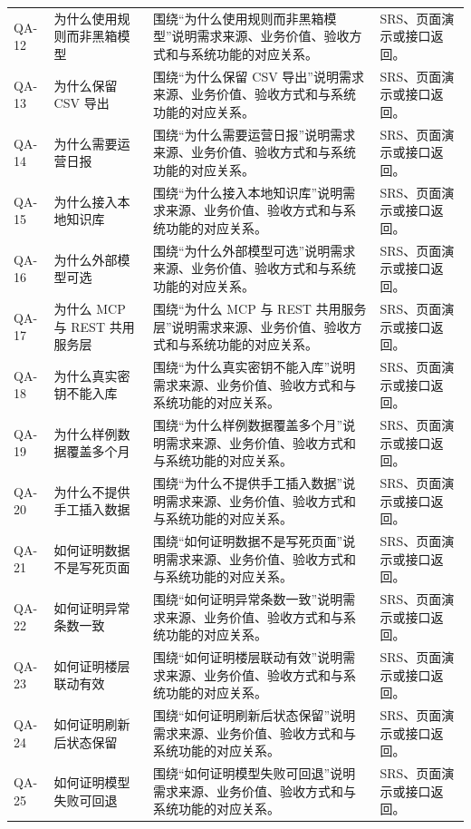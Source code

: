 \documentclass[12pt,a4paper]{ctexart}
\begin{document}
\begin{longtable}{L{1.7cm}L{4.4cm}L{6.0cm}L{3.4cm}}
QA-12 & 为什么使用规则而非黑箱模型 & 围绕“为什么使用规则而非黑箱模型”说明需求来源、业务价值、验收方式和与系统功能的对应关系。 & SRS、页面演示或接口返回。 \\
QA-13 & 为什么保留 CSV 导出 & 围绕“为什么保留 CSV 导出”说明需求来源、业务价值、验收方式和与系统功能的对应关系。 & SRS、页面演示或接口返回。 \\
QA-14 & 为什么需要运营日报 & 围绕“为什么需要运营日报”说明需求来源、业务价值、验收方式和与系统功能的对应关系。 & SRS、页面演示或接口返回。 \\
QA-15 & 为什么接入本地知识库 & 围绕“为什么接入本地知识库”说明需求来源、业务价值、验收方式和与系统功能的对应关系。 & SRS、页面演示或接口返回。 \\
QA-16 & 为什么外部模型可选 & 围绕“为什么外部模型可选”说明需求来源、业务价值、验收方式和与系统功能的对应关系。 & SRS、页面演示或接口返回。 \\
QA-17 & 为什么 MCP 与 REST 共用服务层 & 围绕“为什么 MCP 与 REST 共用服务层”说明需求来源、业务价值、验收方式和与系统功能的对应关系。 & SRS、页面演示或接口返回。 \\
QA-18 & 为什么真实密钥不能入库 & 围绕“为什么真实密钥不能入库”说明需求来源、业务价值、验收方式和与系统功能的对应关系。 & SRS、页面演示或接口返回。 \\
QA-19 & 为什么样例数据覆盖多个月 & 围绕“为什么样例数据覆盖多个月”说明需求来源、业务价值、验收方式和与系统功能的对应关系。 & SRS、页面演示或接口返回。 \\
QA-20 & 为什么不提供手工插入数据 & 围绕“为什么不提供手工插入数据”说明需求来源、业务价值、验收方式和与系统功能的对应关系。 & SRS、页面演示或接口返回。 \\
QA-21 & 如何证明数据不是写死页面 & 围绕“如何证明数据不是写死页面”说明需求来源、业务价值、验收方式和与系统功能的对应关系。 & SRS、页面演示或接口返回。 \\
QA-22 & 如何证明异常条数一致 & 围绕“如何证明异常条数一致”说明需求来源、业务价值、验收方式和与系统功能的对应关系。 & SRS、页面演示或接口返回。 \\
QA-23 & 如何证明楼层联动有效 & 围绕“如何证明楼层联动有效”说明需求来源、业务价值、验收方式和与系统功能的对应关系。 & SRS、页面演示或接口返回。 \\
QA-24 & 如何证明刷新后状态保留 & 围绕“如何证明刷新后状态保留”说明需求来源、业务价值、验收方式和与系统功能的对应关系。 & SRS、页面演示或接口返回。 \\
QA-25 & 如何证明模型失败可回退 & 围绕“如何证明模型失败可回退”说明需求来源、业务价值、验收方式和与系统功能的对应关系。 & SRS、页面演示或接口返回。 \\

\end{longtable}
\end{document}
